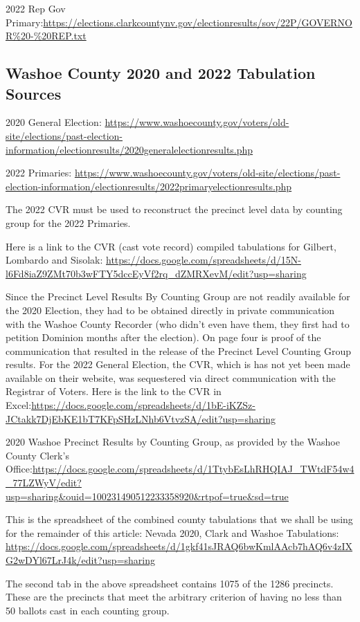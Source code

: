 \documentclass[preprint,13pt]{elsarticle}
\begin{document}
2022 Rep  Gov Primary:\url{https://elections.clarkcountynv.gov/electionresults/sov/22P/GOVERNOR%20-%20REP.txt}

\subsection{Washoe County 2020 and 2022 Tabulation Sources}
2020 General Election: \url{https://www.washoecounty.gov/voters/old-site/elections/past-election-information/electionresults/2020generalelectionresults.php}

2022 Primaries: \url{https://www.washoecounty.gov/voters/old-site/elections/past-election-information/electionresults/2022primaryelectionresults.php}

The 2022 CVR must be used to reconstruct the precinct level data by counting group for the 2022 Primaries.

Here is a link to the CVR (cast vote record) compiled tabulations for Gilbert, Lombardo and Sisolak: \url{https://docs.google.com/spreadsheets/d/15N-l6Fd8iaZ9ZMt70b3wFTY5dccEyVf2rq_dZMRXevM/edit?usp=sharing}

Since the Precinct Level Results By Counting Group are not readily available for the 2020 Election, they had to be obtained directly in private communication with the Washoe
County Recorder (who didn't even have them, they first had to petition Dominion months after the election). On page four is proof of the communication that resulted in the release of the Precinct Level Counting Group results. 
\newpage
For the 2022 General Election, the CVR, which is has not yet been made available on their website, was sequestered via direct communication with the Registrar of Voters. Here is 
the link to the CVR in Excel:\url{https://docs.google.com/spreadsheets/d/1bE-iKZSz-JCtakk7DjEbKE1bT7KFpSHzLNhb6VtvzSA/edit?usp=sharing}

2020 Washoe Precinct Results by Counting Group, as provided by the Washoe County Clerk’s Office:\url{https://docs.google.com/spreadsheets/d/1TtybEsLhRHQIAJ_TWtdF54w4_77LZWyV/edit?usp=sharing&ouid=100231490512233358920&rtpof=true&sd=true}

This is the spreadsheet of the combined county tabulations that we shall be using for the remainder of this article: Nevada 2020, Clark and Washoe Tabulations:\\ \url{https://docs.google.com/spreadsheets/d/1gkf41sJRAQ6bwKmlAAcb7hAQ6v4zIXG2wDYl67LrJ4k/edit?usp=sharing}

 The second tab in the above spreadsheet contains 1075 of the 1286 precincts. These are the precincts that meet the arbitrary criterion of having no less than 50 ballots cast in each counting group.
 
\end{document}
